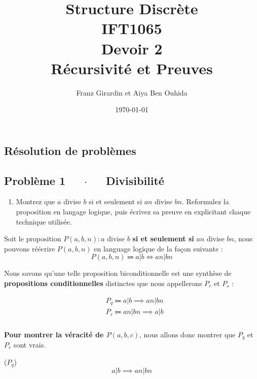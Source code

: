 \documentclass[16pt]{report}
\title{\Huge{Structure Discrète}\\{IFT1065}\\{\textbf{Devoir 2}} \\ {Récursivité et Preuves}}
\author{\huge{Franz Girardin et Aiya Ben Ouhida}}
\date{\today}
\begin{document}
\maketitle

\pagebreak
\begin{multicols*}{2}
\newcommand\scalemath[2]{\scalebox{#1}{\mbox{\ensuremath{\displaystyle #2}}}}

    \chapter{Résolution de problèmes}

    \section*{Problème 1 $\quad$ $\cdot$  $\quad$ Divisibilité}
    \begin{enumerate}
        \item Montrez que $a$ divise $b$ si et seulement si $an$ divise $bn$. Reformulez la proposition
        en langage logique, puis écrivez sa preuve en explicitant chaque technique utilisée.
    \end{enumerate}

    Soit le proposition $P(a, b, n) : a $ divise $b$ \textbf{si et seulement si} $an$ divise $bn$, 
    nous pouvons réécrire $P(a, b, n)$ en language logique de la façon suivante :
    \[ P(a,b,n) \Coloneqq a|b \Leftrightarrow  an|bn \]

    Nous savons qu'une telle proposition biconditionnelle est une synthèse de \textbf{propositions conditionnelles}
    distinctes que nous appellerons $P_r$ et $P_s$ :

    \begin{align}
              &P_q \Coloneqq a|b \implies  an|bn \\ 
              &P_r \Coloneqq an|bn \implies a|b
    \end{align}     
    \paragraph{}
    \textbf{Pour montrer la véracité de $P(a,b,c)$}, nous allons donc montrer que $P_q$ et $P_r$ sont vrais. 
    
    \begin{prop}{($P_q$)}{}
        \[ a|b \implies  an|bn \]
    \end{prop}
    

\end{multicols*}
\end{document}
